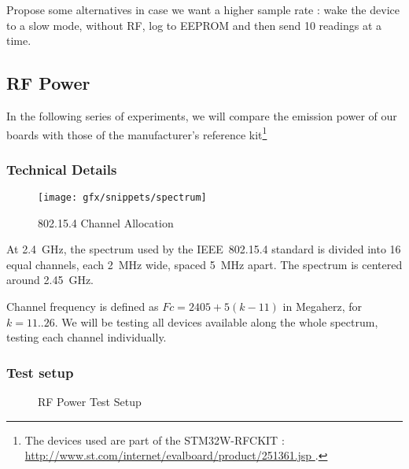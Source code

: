 Propose some alternatives in case we want a higher sample rate : wake the device
to a slow mode, without RF, log to EEPROM and then send 10 readings at a time.

\subsection{RF Power}

In the following series of experiments, we will compare the emission power of
our boards with those of the manufacturer's reference kit\footnote{The devices
used are part of the STM32W-RFCKIT
: \url{ http://www.st.com/internet/evalboard/product/251361.jsp }.}

\subsubsection{Technical Details}

\begin{figure}[htb]
  \begin{center}
    \texttt{[image: gfx/snippets/spectrum]}
  \end{center}
  \caption{802.15.4 Channel Allocation\citep{hunn2010}}
  \label{fig:channel-allocation}
\end{figure}

At \SI{2.4}{GHz}, the spectrum used by the IEEE~802.15.4 standard is divided
into 16 equal channels, each \SI{2}{MHz} wide, spaced \SI{5}{MHz} apart. The
spectrum is centered around \SI{2.45}{GHz}.\citep[pg. 29]{ieee802154}

Channel frequency is defined as $Fc = 2405 + 5 (k-11)$ in Megaherz, for $k
= 11..26$. We will be testing all devices available along the whole spectrum,
testing each channel individually.

\subsubsection{Test setup}

\begin{figure}[htb]
  \begin{center}
  \end{center}
  \caption{RF Power Test Setup}
  \label{fig:power-test-setup}
\end{figure}

